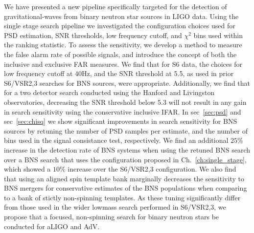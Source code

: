 We have presented a new pipeline specifically targeted for the detection
of gravitational-waves from binary neutron star sources in LIGO data. 
Using the single stage search pipeline we investigated the configuration
choices used for PSD estimation, SNR thresholds, low frequency cutoff, 
and $\chi^2$ bins used within the ranking statistic. 
To assess the sensitivity, we develop a method to measure the false 
alarm rate of possible signals, and introduce the concept of both the
inclusive and exclusive FAR measures. We find that for S6 data, the 
choices for low frequency cutoff at 40Hz, and the SNR threshold at 5.5,
as used in prior S6/VSR2,3 searches for BNS sources, were appropriate.
Additionally, we find that for a two detector search conducted using
the Hanford and Livingston observatories, decreasing the SNR threshold
below 5.3 will not result in any gain in search sensitivity using the conservative 
inclusive IFAR. In sec~\ref{sec:psd} and sec~\ref{sec:chisq} we show significant
improvements in search sensitivity for BNS sources by retuning the number of PSD
samples per estimate, and the number of bins used in the signal consistance test,
respectively. We find an additional $25\%$ increase in the detection rate
of BNS systems when using the retuned BNS search over a BNS search that
uses the configuration proposed in Ch.~\ref{ch:single_stage},
which showed a $10\%$ increase over the S6/VSR2,3 configuration.
 We also find that using an aligned spin template bank marginally decreases the sensitivity 
to BNS mergers for conservative estimates of the BNS populations when
comparing to a bank of stictly non-spinning templates. As these tuning significantly
differ from those used in the wider lowmass search performed in S6/VSR2,3, 
we propose that a focused, non-spinning search for binary neutron
 stars be conducted for aLIGO and AdV.
